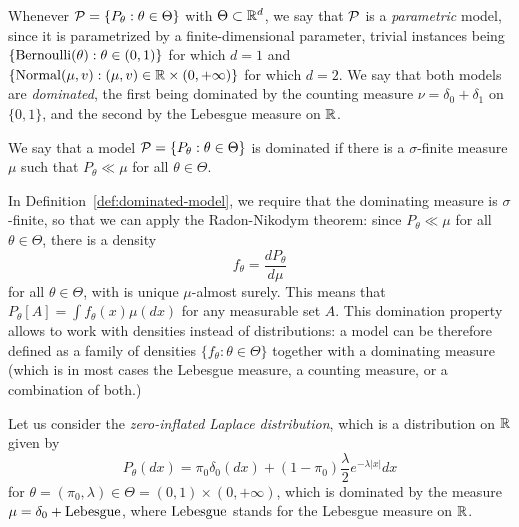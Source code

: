 Whenever $\operatorname{{\mathcal P}} = \{ P_\theta : \theta \in \Theta \}$ with $\Theta \subset \mathbb R^d$, we say that $\operatorname{{\mathcal P}}$ is a \emph{parametric} model, since it is parametrized by a finite-dimensional parameter, trivial instances being $\{ \operatorname{Bernoulli}(\theta) : \theta \in (0, 1) \}$ for which $d=1$ and $\{ \operatorname{Normal}(\mu, v) : (\mu, v) \in \mathbb R \times (0, +\infty) \}$ for which $d=2$.
We say that both models are \emph{dominated}, the first being dominated by the counting measure $\nu = \delta_0 + \delta_1$ on $\{ 0, 1\}$,%
%
and the second by the Lebesgue measure on $\mathbb R$.%
\begin{definition}
	\label{def:dominated-model}
	We say that a model $\operatorname{{\mathcal P}} = \{ P_\theta : \theta \in \Theta \}$ is dominated if there is a $\sigma$-finite measure $\mu$ such that $P_\theta \ll \mu$ for all $\theta \in \Theta$.
\end{definition}
In Definition~\ref{def:dominated-model}, we require that the dominating measure is $\sigma$-finite, so that we can apply the Radon-Nikodym theorem: since $P_\theta \ll \mu$ for all $\theta \in \Theta$, there is a density 
\begin{equation*}
	f_\theta = \frac{dP_\theta}{d\mu}
\end{equation*}
for all $\theta \in \Theta$, with is unique $\mu$-almost surely.
This means that $P_\theta[A] = \int f_\theta(x) \mu(dx)$ for any measurable set $A$.%
This domination property allows to work with densities instead of distributions: a model can be therefore defined as a family of densities $\{ f_\theta : \theta \in \Theta \}$ together with a dominating measure (which is in most cases the Lebesgue measure, a counting measure, or a combination of both.)
\begin{example}
	Let us consider the \emph{zero-inflated Laplace distribution}, which is a distribution on $\mathbb R$ given by
	\begin{equation*}
		P_\theta(dx) = \pi_0 \delta_0(dx) + (1 - \pi_0) \frac{\lambda}{2} e^{-\lambda |x|} dx
	\end{equation*}
	for $\theta = (\pi_0, \lambda) \in \Theta = (0, 1) \times (0, +\infty)$, which is dominated by the measure $\mu = \delta_0 + \operatorname{Lebesgue}$, where $\operatorname{Lebesgue}$ stands for the Lebesgue measure on $\mathbb R$.
\end{example}
